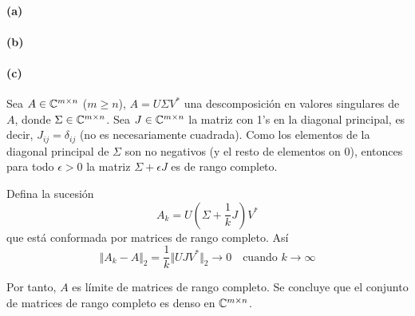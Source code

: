 \paragraph{(a)}
\paragraph{(b)}
\paragraph{(c)}

Sea $A\in\mathbb{C}^{m\times n}$ ($m\geq n$), $A=U\Sigma V^*$ una descomposición en valores singulares de $A$, donde $\Sigma\in\mathbb{C}^{m\times n}$. Sea $J\in\mathbb{C}^{m\times n}$ la matriz con 1's en la diagonal principal, es decir, $J_{ij}=\delta_{ij}$ (no es necesariamente cuadrada). Como los elementos de la diagonal principal de $\Sigma$ son no negativos (y el resto de elementos on 0), entonces para todo $\epsilon>0$ la matriz $\Sigma+\epsilon J$ es de rango completo.

Defina la sucesión
\[
	A_k=U\left(\Sigma+\frac{1}{k}J\right)V^*
\]
que está conformada por matrices de rango completo. Así
\[
	\Vert A_k-A\Vert_2=\frac{1}{k}\Vert UJV^*\Vert_2\to0
	\quad\text{cuando }k\to\infty
\]

Por tanto, $A$ es límite de matrices de rango completo. Se concluye que el conjunto de matrices de rango completo es denso en $\mathbb{C}^{m\times n}$.
